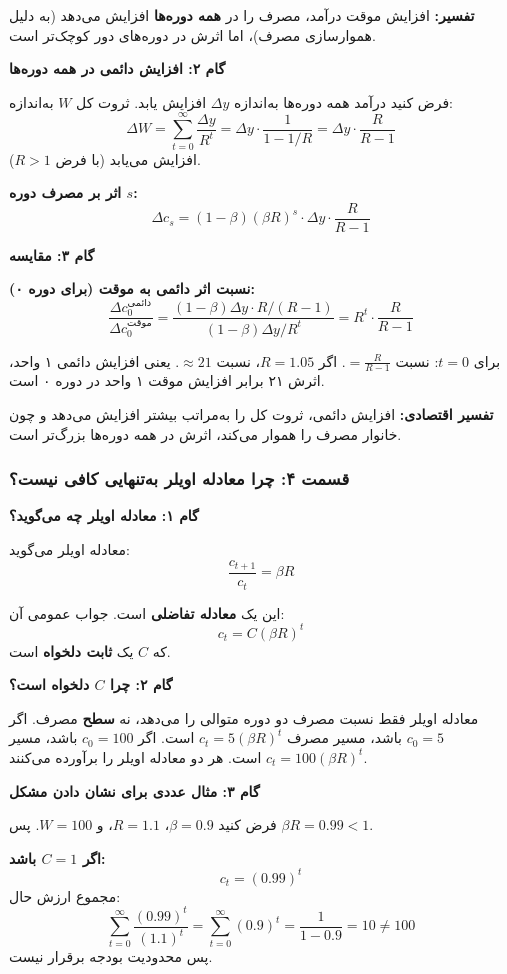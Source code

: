 \documentclass[12pt,a4paper]{article}
\begin{document}
\textbf{تفسیر:} افزایش موقت درآمد، مصرف را در \textbf{همه دوره‌ها} افزایش می‌دهد (به دلیل هموارسازی مصرف)، اما اثرش در دوره‌های دور کوچک‌تر است.

\textbf{گام ۲: افزایش دائمی در همه دوره‌ها}

فرض کنید درآمد همه دوره‌ها به‌اندازه $\Delta y$ افزایش یابد. ثروت کل $W$ به‌اندازه:
\[
	\Delta W = \sum_{t=0}^{\infty} \frac{\Delta y}{R^t} = \Delta y \cdot \frac{1}{1 - 1/R} = \Delta y \cdot \frac{R}{R-1}
\]
افزایش می‌یابد (با فرض $R > 1$).

\textbf{اثر بر مصرف دوره $s$:}
\[
	\Delta c_s = (1-\beta)(\beta R)^s \cdot \Delta y \cdot \frac{R}{R-1}
\]

\textbf{گام ۳: مقایسه}

\textbf{نسبت اثر دائمی به موقت (برای دوره ۰):}
\[
	\frac{\Delta c_0^{\text{دائمی}}}{\Delta c_0^{\text{موقت}}} = \frac{(1-\beta) \Delta y \cdot R/(R-1)}{(1-\beta) \Delta y / R^t} = R^t \cdot \frac{R}{R-1}
\]

برای $t=0$: نسبت $= \frac{R}{R-1}$. اگر $R=1.05$، نسبت $\approx 21$. یعنی افزایش دائمی ۱ واحد، اثرش ۲۱ برابر افزایش موقت ۱ واحد در دوره ۰ است.

\textbf{تفسیر اقتصادی:} افزایش دائمی، ثروت کل را به‌مراتب بیشتر افزایش می‌دهد و چون خانوار مصرف را هموار می‌کند، اثرش در همه دوره‌ها بزرگ‌تر است.

\subsubsection{قسمت ۴: چرا معادله اویلر به‌تنهایی کافی نیست؟}

\textbf{گام ۱: معادله اویلر چه می‌گوید؟}

معادله اویلر می‌گوید:
\[
	\frac{c_{t+1}}{c_t} = \beta R
\]

این یک \textbf{معادله تفاضلی} است. جواب عمومی آن:
\[
	c_t = C (\beta R)^t
\]
که $C$ یک \textbf{ثابت دلخواه} است.

\textbf{گام ۲: چرا $C$ دلخواه است؟}

معادله اویلر فقط نسبت مصرف دو دوره متوالی را می‌دهد، نه \textbf{سطح} مصرف. اگر $c_0 = 5$ باشد، مسیر مصرف $c_t = 5(\beta R)^t$ است. اگر $c_0 = 100$ باشد، مسیر $c_t = 100(\beta R)^t$ است. هر دو معادله اویلر را برآورده می‌کنند.

\textbf{گام ۳: مثال عددی برای نشان دادن مشکل}

فرض کنید $\beta = 0.9$، $R = 1.1$، و $W = 100$. پس $\beta R = 0.99 < 1$.

\textbf{اگر $C = 1$ باشد:}
\[
	c_t = (0.99)^t
\]
مجموع ارزش حال:
\[
	\sum_{t=0}^{\infty} \frac{(0.99)^t}{(1.1)^t} = \sum_{t=0}^{\infty} (0.9)^t = \frac{1}{1-0.9} = 10 \neq 100
\]
پس محدودیت بودجه برقرار نیست.
\end{document}
